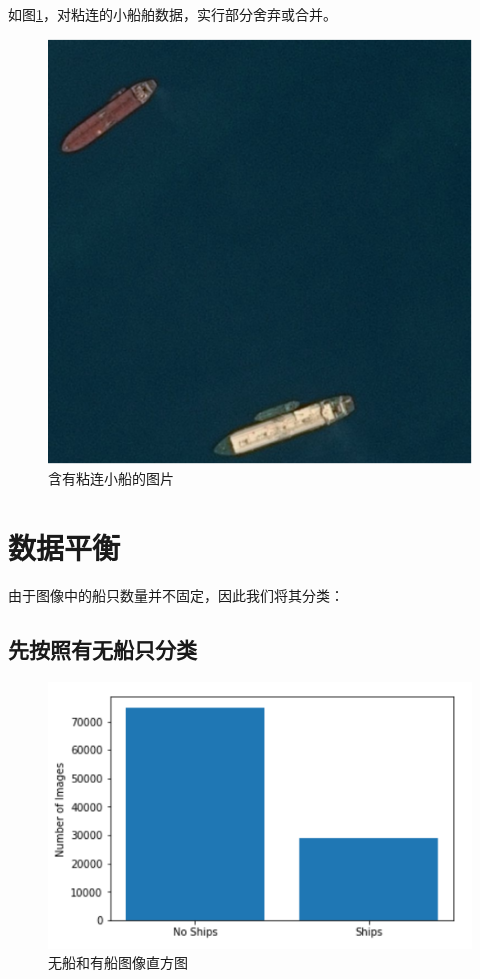 如图\ref{fig::model7}，对粘连的小船舶数据，实行部分舍弃或合并。

\begin{figure}[htbp]
\centering
\includegraphics[width=0.6\linewidth]{body/model_pic/bad_image4}
\caption{含有粘连小船的图片}
\label{fig::model7}
\end{figure}

\section{数据平衡}

由于图像中的船只数量并不固定，因此我们将其分类：

\subsection{先按照有无船只分类}

\begin{figure}[htbp]
\centering
\includegraphics[width=0.8\linewidth]{body/model_pic/noship_ship}
\caption{无船和有船图像直方图}
\label{fig::model8}
\end{figure}

